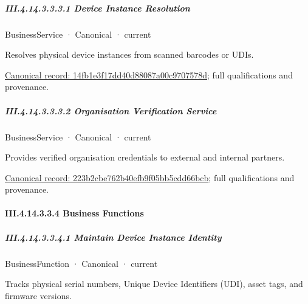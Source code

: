 \subparagraph*{III.4.14.3.3.3.1 Device Instance Resolution}
\label{navigation:III.4.14.3.3.3.1}

\label{element:14fb1e3f17dd40d88087a00c9707578d}
{\small BusinessService · Canonical · current}\par

Resolves physical device instances from scanned barcodes or UDIs.


{\footnotesize \href{../../../../continuum/business/business-service/14fb1e3f17dd40d88087a00c9707578d.md}{Canonical record: 14fb1e3f17dd40d88087a00c9707578d}; full qualifications and provenance.}\par
\subparagraph*{III.4.14.3.3.3.2 Organisation Verification Service}
\label{navigation:III.4.14.3.3.3.2}

\label{element:223b2cbe762b40efb9f05bb5cdd66bcb}
{\small BusinessService · Canonical · current}\par

Provides verified organisation credentials to external and internal partners.


{\footnotesize \href{../../../../continuum/business/business-service/223b2cbe762b40efb9f05bb5cdd66bcb.md}{Canonical record: 223b2cbe762b40efb9f05bb5cdd66bcb}; full qualifications and provenance.}\par
\paragraph*{III.4.14.3.3.4 Business Functions}
\label{navigation:III.4.14.3.3.4}

\subparagraph*{III.4.14.3.3.4.1 Maintain Device Instance Identity}
\label{navigation:III.4.14.3.3.4.1}

\label{element:927796d77f5e4f61835bd2a7bcceb681}
{\small BusinessFunction · Canonical · current}\par

Tracks physical serial numbers, Unique Device Identifiers (UDI), asset tags, and firmware versions.


